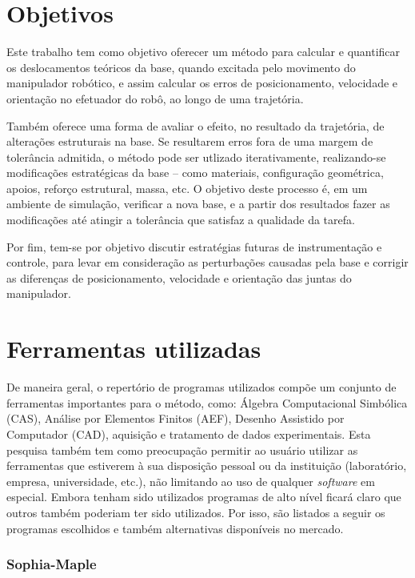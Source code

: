 \section{Objetivos}

Este trabalho tem como objetivo oferecer um método para calcular e quantificar
os deslocamentos teóricos da base, quando excitada pelo movimento do manipulador
robótico, e assim calcular os erros de posicionamento, velocidade e orientação
no efetuador do robô, ao longo de uma trajetória. 

Também oferece uma forma de avaliar o efeito, no resultado da trajetória, de
alterações estruturais na base. Se resultarem erros fora de uma margem de
tolerância admitida, o método pode ser utlizado iterativamente, realizando-se
modificações estratégicas da base -- como materiais, configuração geométrica,
apoios, reforço estrutural, massa, etc.
O objetivo deste processo é, em um ambiente de simulação, verificar a nova base,
e a partir dos resultados fazer as modificações até atingir a tolerância que
satisfaz a qualidade da tarefa.

Por fim, tem-se por objetivo discutir estratégias futuras de instrumentação e
controle, para levar em consideração as perturbações causadas pela base e
corrigir as diferenças de posicionamento, velocidade e orientação das juntas do
manipulador.


\section{Ferramentas utilizadas}

De maneira geral, o repertório de programas utilizados compõe um conjunto de
ferramentas importantes para o método, como: Álgebra Computacional Simbólica
(CAS), Análise por Elementos Finitos (AEF), Desenho Assistido por Computador
(CAD), aquisição e tratamento de dados experimentais. Esta pesquisa também tem
como preocupação permitir ao usuário utilizar as ferramentas que estiverem à sua
disposição pessoal ou da instituição (laboratório, empresa, universidade, etc.),
não limitando ao uso de qualquer \textit{software} em especial. Embora tenham
sido utilizados programas de alto nível ficará claro que outros também poderiam
ter sido utilizados. Por isso, são listados a seguir os programas escolhidos e
também alternativas disponíveis no mercado.

\subsubsection{Sophia-Maple}

